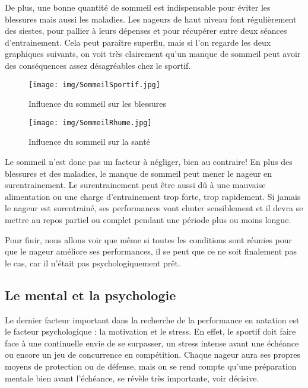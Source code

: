 \vspace{12pt}

De plus, une bonne quantité de sommeil est indispensable pour éviter les blessures mais aussi les maladies. Les nageurs de haut niveau font régulièrement des siestes, pour pallier à leurs dépenses et pour récupérer entre deux séances d'entrainement. Cela peut paraître superflu, mais si l'on regarde les deux graphiques suivants, on voit très clairement qu'un manque de sommeil peut avoir des conséquences assez désagréables chez le sportif.

\begin{figure}[h]
\begin{center}
 \texttt{[image: img/SommeilSportif.jpg]}
 \end{center}
 \caption{Influence du sommeil sur les blessures}
 \label{Influence du sommeil sur les blessures}
\end{figure}

\begin{figure}[h]
\begin{center}
 \texttt{[image: img/SommeilRhume.jpg]}
 \end{center}
 \caption{Influence du sommeil sur la santé}
 \label{Influence du sommeil sur la santé}
\end{figure}

\vspace{12pt}

Le sommeil n'est donc pas un facteur à négliger, bien au contraire! En plus des blessures et des maladies, le manque de sommeil peut mener le nageur en \gls{surentrainement}. Le \gls{surentrainement} peut être aussi dû à une mauvaise alimentation ou une charge d'entrainement trop forte, trop rapidement. Si jamais le nageur est surentrainé, ses performances vont chuter sensiblement et il devra se mettre au repos partiel ou complet pendant une période plus ou moins longue.

\vspace{12pt}

Pour finir, nous allons voir que même si toutes les conditions sont réunies pour que le nageur améliore ses performances, il se peut que ce ne soit finalement pas le cas, car il n'était pas psychologiquement prêt.


\subsection{Le mental et la psychologie}

Le dernier facteur important dans la recherche de la performance en natation est le facteur psychologique : la motivation et le stress. En effet, le sportif doit faire face à une continuelle envie de se surpasser, un stress intense avant une échéance ou encore un jeu de concurrence en compétition. Chaque nageur aura ses propres moyens de protection ou de défense, mais on se rend compte qu'une préparation mentale bien avant l'échéance, se révèle très importante, voir décisive.

